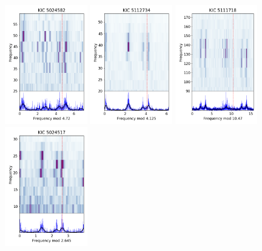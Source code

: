 \begin{figure}
    \centering
    \includegraphics[width=0.32\textwidth]{Chapter5/5024582_echelle.png}
    \includegraphics[width=0.32\textwidth]{Chapter5/5112734_echelle.png}
    \includegraphics[width=0.32\textwidth]{Chapter5/5111718_echelle.png}
    \includegraphics[width=0.32\textwidth]{Chapter5/5024517_a_echelle.png}

\end{figure}
